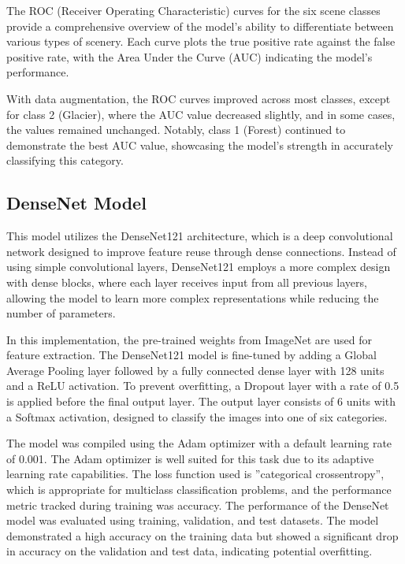 The ROC (Receiver Operating Characteristic) curves for the six scene classes provide a comprehensive overview of the model’s ability to differentiate between various types of scenery. Each curve plots the true positive rate against the false positive rate, with the Area Under the Curve (AUC) indicating the model’s performance.

With data augmentation, the ROC curves improved across most classes, except for class 2 (Glacier), where the AUC value decreased slightly, and in some cases, the values remained unchanged. Notably, class 1 (Forest) continued to demonstrate the best AUC value, showcasing the model's strength in accurately classifying this category. 



\subsection{DenseNet Model}

This model utilizes the DenseNet121 architecture, which is a deep convolutional network designed to improve feature reuse through dense connections. Instead of using simple convolutional layers, DenseNet121 employs a more complex design with dense blocks, where each layer receives input from all previous layers, allowing the model to learn more complex representations while reducing the number of parameters.

In this implementation, the pre-trained weights from ImageNet are used for feature extraction. The DenseNet121 model is fine-tuned by adding a Global Average Pooling layer followed by a fully connected dense layer with 128 units and a ReLU activation. To prevent overfitting, a Dropout layer with a rate of 0.5 is applied before the final output layer. The output layer consists of 6 units with a Softmax activation, designed to classify the images into one of six categories.

The model was compiled using the Adam optimizer with a default learning rate of 0.001. The Adam optimizer is well suited for this task due to its adaptive learning rate capabilities.
The loss function used is ”categorical crossentropy”, which is appropriate for multiclass classification problems, and the performance metric tracked during training was accuracy.
The performance of the DenseNet model was evaluated using training, validation, and test datasets. The model demonstrated a high accuracy on the training data but showed a significant drop in accuracy on the validation and test data, indicating potential overfitting.

